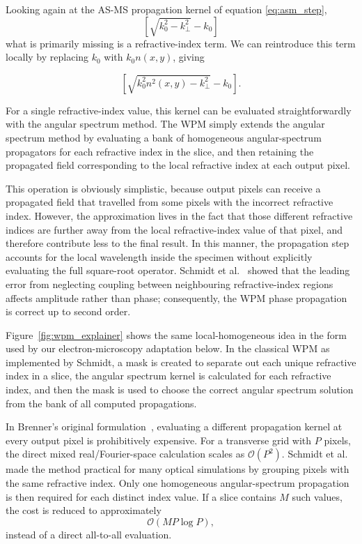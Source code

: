 \documentclass[preprint,12pt,number]{elsarticle}
\begin{document}
Looking again at the AS-MS propagation kernel of equation \eqref{eq:asm_step},
\[
\left[\sqrt{k_0^2-k_\perp^2}-k_0\right]
\]
what is primarily missing is a refractive-index term. We can reintroduce this term locally
by replacing $k_0$ with $k_0n(x,y)$, giving

\[
\left[\sqrt{k_0^2n^2(x,y)-k_\perp^2}-k_0\right].
\]

For a single refractive-index value, this kernel can be evaluated
straightforwardly with the angular spectrum method. The WPM simply extends the
angular spectrum method by evaluating a bank of homogeneous angular-spectrum
propagators for each refractive index in the slice, and then retaining the
propagated field corresponding to the local refractive index at each output
pixel.

This operation is obviously simplistic, because output pixels can receive a
propagated field that travelled from some pixels with the incorrect refractive
index. However, the approximation lives in the fact that those different
refractive indices are further away from the local refractive-index value of
that pixel, and therefore contribute less to the final result. In this manner,
the propagation step accounts for the local wavelength inside the specimen
without explicitly evaluating the full square-root operator. Schmidt
et al.~\cite{Schmidt2016} showed that the leading error from neglecting coupling
between neighbouring refractive-index regions affects amplitude rather than
phase; consequently, the WPM phase propagation is correct up to second order.

Figure~\ref{fig:wpm_explainer} shows the same local-homogeneous idea in the
form used by our electron-microscopy adaptation below. In the classical WPM as
implemented by Schmidt, a mask is created to separate out each unique refractive index in a
slice, the angular spectrum kernel is calculated for each refractive index, and
then the mask is used to choose the correct angular spectrum solution from the
bank of all computed propagations.

In Brenner's original formulation~\cite{Brenner1993}, evaluating a different
propagation kernel at every output pixel is prohibitively expensive. For a
transverse grid with $P$ pixels, the direct mixed real/Fourier-space calculation
scales as
$\mathcal O(P^2)$. Schmidt et al.~\cite{Schmidt2016} made the method practical
for many optical simulations by grouping pixels with the same refractive
index. Only one homogeneous angular-spectrum propagation is then required for
each distinct index value. If a slice contains $M$ such values, the cost is
reduced to approximately
\[
\mathcal O(MP\log P),
\]
instead of a direct all-to-all evaluation.
\end{document}
